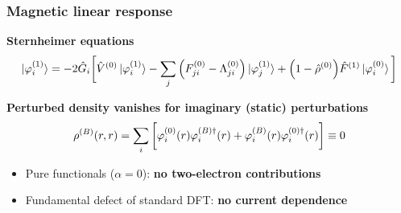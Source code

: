 \begin{frame}
\frametitle{Magnetic linear response}
\centering
\textbf{Sternheimer equations}
\begin{equation}
    \nonumber
    \ket{\varphi_i^{(1)}} = -2\hat{G}_i\bigg[
    \hat{V}^{(0)}\ket{\varphi_i^{(1)}} -
    \sum_j \Big(F^{(0)}_{ji} - \Lambda^{(0)}_{ji}\Big)
    \ket{\varphi_j^{(1)}} +
    \Big(1 - \hat{\rho}^{(0)}\Big)
    \hat{F}^{(1)}\ket{\varphi_i^{(0)}}
    \bigg]
\end{equation}

\vspace{5mm}



\vspace{5mm}

\textbf{Perturbed density vanishes for imaginary (static) perturbations}
\begin{equation}
    \nonumber
    \rho^{(B)}(r,r) = \sum_i 
    \bigg[
    \varphi_i^{(0)}(r)\varphi_i^{(B)\dagger}(r) +
    \varphi_i^{(B)}(r)\varphi_i^{(0)\dagger}(r)
    \bigg]
    \equiv 0
\end{equation}

\vspace{5mm}

\pause
\begin{itemize}
    \item   Pure functionals ($\alpha=0$): \textbf{no two-electron contributions}
    \item   Fundamental defect of standard DFT: \textbf{no current dependence}
\end{itemize}

\end{frame}

